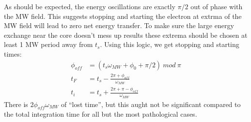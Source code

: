 \documentclass[aps,pra,preprint,groupedaddress]{revtex4-1}
\begin{document}
As should be expected, the energy oscillations are exactly $\pi/2$ out of phase with the MW field. This suggests stopping and starting the electron at extrma of the MW field will lead to zero net energy transfer. To make sure the large energy exchange near the core doesn't mess up results these extrema should be chosen at least 1 MW period away from $t_s$. Using this logic, we get stopping and starting times:
\begin{align*}
\phi_{off} & = \left( t_s \omega_{MW} + \phi_0 +\pi/2 \right) ~mod~ \pi \\
t_F & = t_s - \frac{2\pi + \phi_{off}}{\omega_{MW}} \\
t_i & = t_s + \frac{2\pi + \pi - \phi_{off}}{\omega_{MW}}
\end{align*}
There is $2\phi_{off} \omega_{MW}$ of ``lost time'', but this aught not be significant compared to the total integration time for all but the most pathological cases. 
\end{document}

